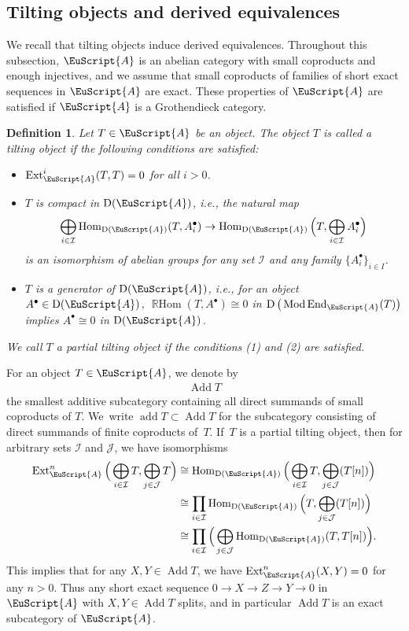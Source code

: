 \documentclass[pdftex]{sigma}%
\newtheorem{dfn}{Definition}[section]
\numberwithin{equation}{section}
\newcommand{\Hom}{\operatorname{Hom}}
\newcommand{\Ext}{\operatorname{Ext}}
\newcommand{\RHom}{\operatorname{{\mathbb R}Hom}}
\newcommand{\End}{\operatorname{End}}
\newcommand{\Mod}{\operatorname{Mod}}
\newcommand{\add}{\operatorname{add}}
\newcommand{\Add}{\operatorname{Add}}
\newcommand{\D}{\operatorname{D}}
\newcommand{\cI}{\mathcal{I}}
\newcommand{\cJ}{\mathcal{J}}
\newcommand{\scrA}{\EuScript{A}}
\begin{document}
\subsection{Tilting objects and derived equivalences}

We recall that tilting objects induce derived equivalences.
Throughout this subsection, $\scrA$ is an abelian category with small coproducts and enough injectives, and we assume that small coproducts of families of short exact sequences in $\scrA$ are exact. These properties of $\scrA$ are satisfied if $\scrA$ is a Grothendieck category.

\begin{dfn} Let $T\in \scrA$ be an object. The object $T$ is called a {\it tilting object} if the following conditions are satisfied:
\begin{itemize}\itemsep=0pt
\item[$1.$] $\Ext_{\scrA}^i(T,T)=0$ for all $i>0$.

\item[$2.$] $T$ is {\it compact} in $\D(\scrA)$, i.e., the natural map
\begin{gather*}
\bigoplus_{i\in \cI}\Hom_{\D(\scrA)}(T,A_i^{\bullet})\to\Hom_{\D(\scrA)}\Big(T,\bigoplus_{i\in\cI}A_i^{\bullet}\Big)
\end{gather*}
is an isomorphism of abelian groups for any set $\cI$ and any family $\{A_i^{\bullet}\}_{i\in I}$.

\item[$3.$] $T$ is a {\it generator} of $\D(\scrA)$, i.e., for an object $A^{\bullet}\in \D(\scrA)$, $\RHom(T,A^{\bullet})\cong0$ in $\D\big(\Mod\End_{\scrA}(T)\big)$ implies $A^{\bullet}\cong0$ in $\D(\scrA)$.
\end{itemize}
We call $T$ a {\it partial tilting object} if the conditions (1) and (2) are satisfied.
\end{dfn}

For an object $T\in \scrA$, we denote by
\begin{gather*}
\Add T
\end{gather*}
the smallest additive subcategory containing all direct summands of small coproducts of $T$. We~write $\add T\subset \Add T$ for the subcategory consisting of direct summands of finite coproducts of~$T$. If~$T$ is a partial tilting object, then for arbitrary sets $\cI$ and $\cJ$, we have isomorphisms
\begin{align*}
\Ext^n_{\scrA}\Big(\bigoplus_{i\in \cI}T,\bigoplus_{j\in \cJ}T\Big) &\cong\Hom_{\D(\scrA)}\Big(\bigoplus_{i\in \cI}T,\bigoplus_{j\in \cJ}(T[n])\Big)
\\
&\cong \prod_{i\in \cI}\Hom_{\D(\scrA)}\Big(T,\bigoplus_{j\in \cJ}(T[n])\Big)
\\
&\cong \prod_{i\in\cI}\Big(\bigoplus_{j\in\cJ}\Hom_{\D(\scrA)}(T,T[n])\Big).
\end{align*}
This implies that for any $X,Y\in \Add T$, we have $\Ext_{\scrA}^n(X,Y)=0$ for any $n>0$. Thus any short exact sequence $0\to X\to Z\to Y\to0$ in $\scrA$ with $X,Y\in \Add T$ splits, and in particular $\Add T$ is an exact subcategory of $\scrA$.
\end{document}
